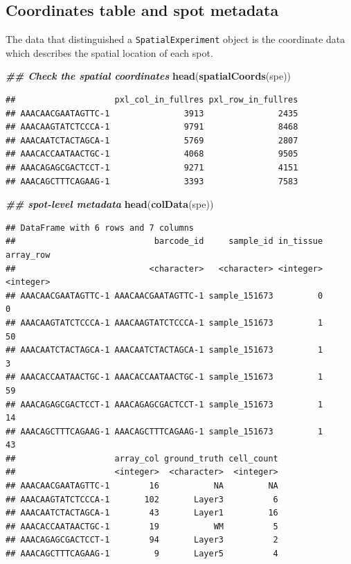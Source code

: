 \documentclass[
]{book}
\newenvironment{Shaded}{\begin{snugshade}}{\end{snugshade}}
\newcommand{\DocumentationTok}[1]{\textcolor[rgb]{0.56,0.35,0.01}{\textbf{\textit{#1}}}}
\newcommand{\FunctionTok}[1]{\textcolor[rgb]{0.13,0.29,0.53}{\textbf{#1}}}
\newcommand{\NormalTok}[1]{#1}
\begin{document}
\hypertarget{coordinates-table-and-spot-metadata}{%
\subsection{Coordinates table and spot metadata}\label{coordinates-table-and-spot-metadata}}

The data that distinguished a \texttt{SpatialExperiment} object is the coordinate data which describes the spatial location of each spot.

\begin{Shaded}
\begin{Highlighting}[]
\DocumentationTok{\#\# Check the spatial coordinates}
\FunctionTok{head}\NormalTok{(}\FunctionTok{spatialCoords}\NormalTok{(spe))}
\end{Highlighting}
\end{Shaded}

\begin{verbatim}
##                    pxl_col_in_fullres pxl_row_in_fullres
## AAACAACGAATAGTTC-1               3913               2435
## AAACAAGTATCTCCCA-1               9791               8468
## AAACAATCTACTAGCA-1               5769               2807
## AAACACCAATAACTGC-1               4068               9505
## AAACAGAGCGACTCCT-1               9271               4151
## AAACAGCTTTCAGAAG-1               3393               7583
\end{verbatim}

\begin{Shaded}
\begin{Highlighting}[]
\DocumentationTok{\#\# spot{-}level metadata}
\FunctionTok{head}\NormalTok{(}\FunctionTok{colData}\NormalTok{(spe))}
\end{Highlighting}
\end{Shaded}

\begin{verbatim}
## DataFrame with 6 rows and 7 columns
##                            barcode_id     sample_id in_tissue array_row
##                           <character>   <character> <integer> <integer>
## AAACAACGAATAGTTC-1 AAACAACGAATAGTTC-1 sample_151673         0         0
## AAACAAGTATCTCCCA-1 AAACAAGTATCTCCCA-1 sample_151673         1        50
## AAACAATCTACTAGCA-1 AAACAATCTACTAGCA-1 sample_151673         1         3
## AAACACCAATAACTGC-1 AAACACCAATAACTGC-1 sample_151673         1        59
## AAACAGAGCGACTCCT-1 AAACAGAGCGACTCCT-1 sample_151673         1        14
## AAACAGCTTTCAGAAG-1 AAACAGCTTTCAGAAG-1 sample_151673         1        43
##                    array_col ground_truth cell_count
##                    <integer>  <character>  <integer>
## AAACAACGAATAGTTC-1        16           NA         NA
## AAACAAGTATCTCCCA-1       102       Layer3          6
## AAACAATCTACTAGCA-1        43       Layer1         16
## AAACACCAATAACTGC-1        19           WM          5
## AAACAGAGCGACTCCT-1        94       Layer3          2
## AAACAGCTTTCAGAAG-1         9       Layer5          4
\end{verbatim}
\end{document}
